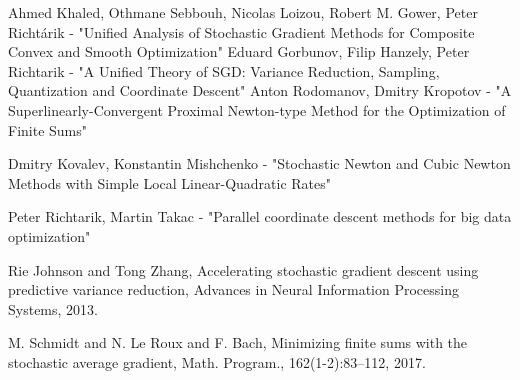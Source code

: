 \documentclass{article}
\begin{document}
\begin{thebibliography}{}
     Ahmed Khaled, Othmane Sebbouh, Nicolas Loizou, Robert M. Gower, Peter Richtárik - "Unified Analysis of Stochastic Gradient Methods for Composite Convex and Smooth Optimization"
     Eduard Gorbunov, Filip Hanzely, Peter Richtarik  -  "A Unified Theory of SGD: Variance Reduction, Sampling, Quantization and Coordinate Descent"
     Anton Rodomanov, Dmitry Kropotov - "A Superlinearly-Convergent Proximal Newton-type Method for the Optimization of Finite Sums"
    
     Dmitry Kovalev, Konstantin Mishchenko - "Stochastic Newton and Cubic Newton Methods with Simple Local Linear-Quadratic Rates"
    
    Peter Richtarik, Martin Takac - "Parallel coordinate descent methods for big data optimization"

    
 Rie Johnson and Tong Zhang, Accelerating stochastic gradient descent using predictive variance reduction, Advances in Neural Information Processing Systems, 2013.
 
    M. Schmidt and N. Le Roux and F. Bach, Minimizing finite sums with the stochastic average
gradient, Math. Program., 162(1-2):83–112, 2017.
\end{thebibliography}
\end{document}
